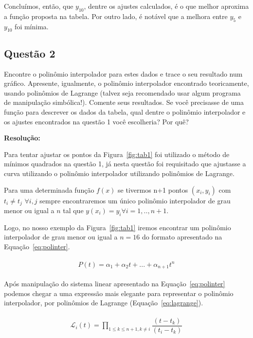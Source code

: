 \documentclass[12pt]{article}
\begin{document}
Concluímos, então, que $y_{10}$, dentre os ajustes calculados, é o que melhor aproxima a função proposta na tabela.
Por outro lado, é notável que a melhora entre $y_{5}$ e $y_{10}$ foi mínima.

\subsection{Questão 2}
\label{subsec:p1q2}

Encontre o polinômio interpolador para estes dados e trace o seu resultado num gráfico. Apresente, igualmente, o polinômio interpolador encontrado teoricamente, usando polinômios de Lagrange (talvez seja recomendado usar algum programa de manipulação simbólica!). Comente seus resultados. Se você precisasse de uma função para descrever os dados da tabela, qual dentre o polinômio interpolador e os ajustes encontrados na questão 1 você escolheria? Por quê?

\textbf{Resolução:}

Para tentar ajustar os pontos da Figura~\ref{fig:tab1} foi utilizado o método de mínimos quadrados na questão 1, já nesta questão foi requisitado que ajustasse a curva utilizando o polinômio interpolador utilizando polinômios de Lagrange.

Para uma determinada função $f(x)$ se tivermos n+1 pontos $(x_{i}, y_{i})$ com $t_{i} \neq t_{j}$ $\forall i,j$ sempre encontraremos um único polinômio interpolador de grau menor ou igual a $n$ tal que $y(x_{i}) = y_{i} \forall i=1,..,n+1$.

Logo, no nosso exemplo da Figura~\ref{fig:tab1} iremos encontrar um polinômio interpolador de grau menor ou igual a $n = 16$ do formato apresentado na Equação~\ref{eq:polinter}.

\begin{eqnarray}
\begin{split}
P(t) = \alpha_{1} + \alpha_{2}t + ... + \alpha_{n+1}t^{n}
\end{split}
\label{eq:polinter}
\end{eqnarray}

Após manipulação do sistema linear apresentado na Equação~\ref{eq:polinter} podemos chegar a uma expressão mais elegante para representar o polinômio interpolador, por polinômios de Lagrange (Equação~\ref{eq:lagrange}).

\begin{eqnarray}
\begin{split}
\mathcal{L}_{i}(t) = \prod_{1 \leq k \leq n+1,  k \neq i} \dfrac{(t - t_{k})}{(t_{i} - t_{k})}
\end{split}
\label{eq:lagrange}
\end{eqnarray}
\end{document}
